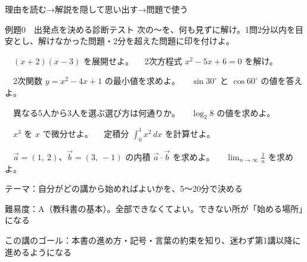\documentclass[paper=b5j, fontsize=8pt, fleqn, twoside]{jlreq}
\begin{document}
\begin{center}
\vfill
{\footnotesize
理由を読む\quad →\quad 解説を隠して思い出す\quad →\quad 問題で使う\par}
\vspace{4mm}
\end{center}

\clearpage
\label{kou0}
\begin{ascolorbox4A}[出典：オリジナル]{例題0　出発点を決める診断テスト}
  次の〜を、何も見ずに解け。1問2分以内を目安とし、解けなかった問題・2分を超えた問題に印を付けよ。\par
  　$(x+2)(x-3)$ を展開せよ。\qquad
  　2次方程式 $x^2-5x+6=0$ を解け。\par
  　2次関数 $y=x^2-4x+1$ の最小値を求めよ。\qquad
  　$\sin 30^\circ$ と $\cos 60^\circ$ の値を答えよ。\par
  　異なる5人から3人を選ぶ選び方は何通りか。\qquad
  　$\log_2 8$ の値を求めよ。\par
  　$x^3$ を $x$ で微分せよ。\qquad
  　定積分 $\displaystyle\int_0^1 x^2\,dx$ を計算せよ。\par
  　$\vec{a}=(1,\ 2)$、$\vec{b}=(3,\ -1)$ の内積 $\vec{a}\cdot\vec{b}$ を求めよ。\qquad
  　$\displaystyle\lim_{n\to\infty}\frac{1}{n}$ を求めよ。
\end{ascolorbox4A}

\begin{Data}
  テーマ：自分がどの講から始めればよいかを、5〜20分で決める\par
  難易度：A（教科書の基本）。全部できなくてよい。できない所が「始める場所」になる\par
  この講のゴール：本書の進め方・記号・言葉の約束を知り、迷わず第1講以降に進めるようになる
\end{Data}
\end{document}
